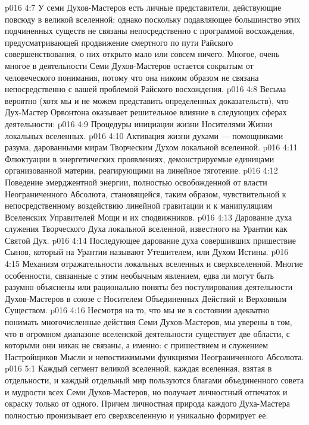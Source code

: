 \vs p016 4:7 У семи Духов\hyp{}Мастеров есть личные представители, действующие повсюду в великой вселенной; однако поскольку подавляющее большинство этих подчиненных существ не связаны непосредственно с программой восхождения, предусматривающей продвижение смертного по пути Райского совершенствования, о них открыто мало или совсем ничего. Многое, очень многое в деятельности Семи Духов\hyp{}Мастеров остается сокрытым от человеческого понимания, потому что она никоим образом не связана непосредственно с вашей проблемой Райского восхождения.
\vs p016 4:8 \pc Весьма вероятно (хотя мы и не можем представить определенных доказательств), что Дух\hyp{}Мастер Орвонтона оказывает решительное влияние в следующих сферах деятельности:
\vs p016 4:9 \bibnobreakspace Процедуры инициации жизни Носителями Жизни локальных вселенных.
\vs p016 4:10 \bibnobreakspace Активация жизни духами --- помощниками разума, дарованными мирам Творческим Духом локальной вселенной.
\vs p016 4:11 \bibnobreakspace Флюктуации в энергетических проявлениях, демонстрируемые единицами организованной материи, реагирующими на линейное тяготение.
\vs p016 4:12 \bibnobreakspace Поведение эмерджентной энергии, полностью освобожденной от власти Неограниченного Абсолюта, становящейся, таким образом, чувствительной к непосредственному воздействию линейной гравитации и к манипуляциям Вселенских Управителей Мощи и их сподвижников.
\vs p016 4:13 \bibnobreakspace Дарование духа служения Творческого Духа локальной вселенной, известного на Урантии как Святой Дух.
\vs p016 4:14 \bibnobreakspace Последующее дарование духа совершивших пришествие Сынов, который на Урантии называют Утешителем, или Духом Истины.
\vs p016 4:15 \bibnobreakspace Механизм отражательности локальных вселенных и сверхвселенной. Многие особенности, связанные с этим необычным явлением, едва ли могут быть разумно объяснены или рационально поняты без постулирования деятельности Духов\hyp{}Мастеров в союзе с Носителем Объединенных Действий и Верховным Существом.
\vs p016 4:16 \pc Несмотря на то, что мы не в состоянии адекватно понимать многочисленные действия Семи Духов\hyp{}Мастеров, мы уверены в том, что в огромном диапазоне вселенской деятельности существует две области, с которыми они никак не связаны, а именно: с пришествием и служением Настройщиков Мысли и непостижимыми функциями Неограниченного Абсолюта.
\vs p016 5:1 Каждый сегмент великой вселенной, каждая вселенная, взятая в отдельности, и каждый отдельный мир пользуются благами объединенного совета и мудрости всех Семи Духов\hyp{}Мастеров, но получает личностный отпечаток и окраску только от одного. Причем личностная природа каждого Духа\hyp{}Мастера полностью пронизывает его сверхвселенную и уникально формирует ее.
